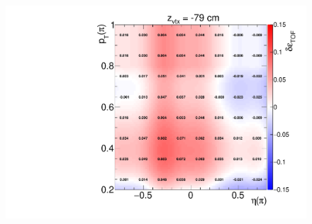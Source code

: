 \begin{figure}
{		\includegraphics[width=\linewidth,page=51]{graphics/systematicsEfficiency/TOF_tagAndProbe/correction/TofEffCorrection3D_pion.pdf}
	}%
\end{figure}
